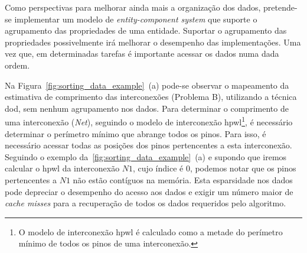 \begin{table}[h]
\centering
\caption{Síntese dos resultados preliminares.}
\label{tab:sintese_resultados}
\end{table}

Como perspectivas para melhorar ainda mais a organização dos dados, pretende-se implementar um modelo de \textit{entity-component system} que suporte o agrupamento das propriedades de uma entidade.
Suportar o agrupamento das propriedades possivelmente irá melhorar o desempenho das implementações.
Uma vez que, em determinadas tarefas é importante acessar os dados numa dada ordem.

Na Figura~\ref{fig:sorting_data_example}~(a) pode-se observar o mapeamento da estimativa de comprimento das interconexões (Problema B), utilizando a técnica \ac{dod}, sem nenhum agrupamento nos dados.
Para determinar o comprimento de uma interconexão (\textit{Net}), seguindo o modelo de interconexão \ac{hpwl}\footnote{O modelo de interconexão \ac{hpwl} é calculado como a metade do perímetro mínimo de todos os pinos de uma interconexão.}, é necessário determinar o perímetro mínimo que abrange todos os pinos.
Para isso, é necessário acessar todas as posições dos pinos pertencentes a esta interconexão.
Seguindo o exemplo da~\ref{fig:sorting_data_example}~(a) e supondo que iremos calcular o \ac{hpwl} da interconexão $N1$, cujo índice é $0$, podemos notar que os pinos pertencentes a $N1$ não estão contíguos na memória.
Esta esparsidade nos dados pode depreciar o desempenho do acesso aos dados e exigir um número maior de \textit{cache misses} para a recuperação de todos os dados requeridos pelo algoritmo.

